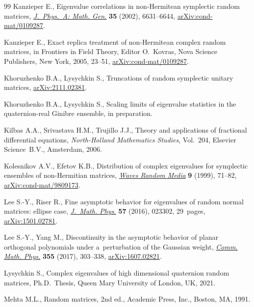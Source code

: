 \documentclass[pdftex]{sigma}
\numberwithin{equation}{section}
\newcommand{\1}{\chi}
\begin{document}
\begin{thebibliography}{99}
Kanzieper E., Eigenvalue correlations in non-{H}ermitean symplectic random
 matrices, \href{https://doi.org/10.1088/0305-4470/35/31/308}{\textit{J.~Phys.~A: Math. Gen.}} \textbf{35} (2002), 6631--6644,
 \href{https://arxiv.org/abs/cond-mat/0109287}{arXiv:cond-mat/0109287}.

Kanzieper E., Exact replica treatment of non-{H}ermitean complex random
 matrices, in Frontiers in Field Theory, Editor O.~Kovras, Nova Science
 Publishers, New York, 2005, 23--51, \href{https://arxiv.org/abs/cond-mat/0109287}{arXiv:cond-mat/0109287}.

Khoruzhenko B.A., Lysychkin S., Truncations of random symplectic unitary
 matrices, \href{https://arxiv.org/abs/2111.02381}{arXiv:2111.02381}.

Khoruzhenko B.A., Lysychkin S., Scaling limits of eigenvalue statistics in the
 quaternion-real {G}inibre ensemble, {i}n preparation.

Kilbas A.A., Srivastava H.M., Trujillo J.J., Theory and applications of
 fractional differential equations, \textit{North-Holland Mathematics
 Studies}, Vol.~204, Elsevier Science~B.V., Amsterdam, 2006.

Kolesnikov A.V., Efetov K.B., Distribution of complex eigenvalues for
 symplectic ensembles of non-{H}ermitian matrices, \href{https://doi.org/10.1088/0959-7174/9/2/301}{\textit{Waves Random Media}}
 \textbf{9} (1999), 71--82, \href{https://arxiv.org/abs/cond-mat/9809173}{arXiv:cond-mat/9809173}.

Lee S.-Y., Riser R., Fine asymptotic behavior for eigenvalues of random normal
 matrices: ellipse case, \href{https://doi.org/10.1063/1.4939973}{\textit{J.~Math. Phys.}} \textbf{57} (2016), 023302,
 29~pages, \href{https://arxiv.org/abs/1501.02781}{arXiv:1501.02781}.

Lee S.-Y., Yang M., Discontinuity in the asymptotic behavior of planar
 orthogonal polynomials under a~perturbation of the {G}aussian weight,
 \href{https://doi.org/10.1007/s00220-017-2888-8}{\textit{Comm. Math. Phys.}} \textbf{355} (2017), 303--338,
 \href{https://arxiv.org/abs/1607.02821}{arXiv:1607.02821}.

Lysychkin S., Complex eigenvalues of high dimensional quaternion random
 matrices, Ph.D.~Thesis, {Q}ueen Mary University of London, UK, 2021.

Mehta M.L., Random matrices, 2nd ed., Academic Press, Inc., Boston, MA, 1991.


\end{thebibliography}
\end{document}
